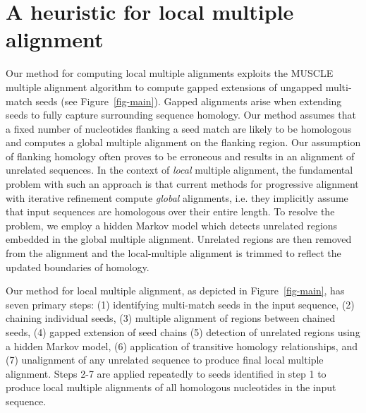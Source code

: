 \documentclass{ws-procs975x65}
\begin{document}
\section{A heuristic for local multiple alignment}
Our method for computing local multiple alignments exploits the MUSCLE multiple alignment algorithm to compute gapped extensions of ungapped multi-match seeds (see Figure~\ref{fig-main}). Gapped alignments arise when extending seeds to fully capture surrounding sequence homology. Our method assumes that a fixed number of nucleotides flanking a seed match are likely to be homologous and computes a global multiple alignment on the flanking region.  Our assumption of flanking homology often proves to be erroneous and results in an alignment of unrelated sequences.  In the context of \textit{local} multiple alignment, the fundamental problem with such an approach is that current methods for progressive alignment with iterative refinement compute \textit{global} alignments, i.e. they implicitly assume that input sequences are homologous over their entire length.  To resolve the problem, we employ a hidden Markov model which detects unrelated regions embedded in the global multiple alignment.  Unrelated regions are then removed from the alignment and the local-multiple alignment is trimmed to reflect the updated boundaries of homology.

Our method for local multiple alignment, as depicted in Figure~\ref{fig-main},
has seven primary steps: (1) identifying multi-match seeds in the input sequence, (2) chaining individual seeds, (3) multiple alignment of regions between chained seeds, (4) gapped extension of seed chains (5) detection of unrelated regions using a hidden Markov model, (6) application of transitive homology relationships, and (7) unalignment of any unrelated sequence to produce final local multiple alignment.  Steps 2-7 are applied repeatedly to seeds identified in step 1 to produce local multiple alignments of all homologous nucleotides in the input sequence.
\end{document}
